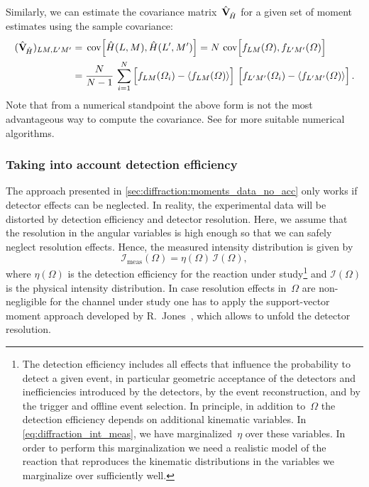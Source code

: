 Similarly, we can estimate the covariance
matrix~$\hat{\mathbf{V}}_{\!\hat{H}}$ for a given set of moment
estimates using the sample covariance:
\begin{align}
  (\hat{\covMatSym}_{\!\hat{H}})_{L M, L' M'}
  ={}& \cov[2]{\hat{H}(L, M), \hat{H}(L', M')}
  = N\, \cov[2]{f_{L M}(\Omega), f_{L' M'}(\Omega)} \notag
  \\
  \label{eq:diffraction_sample_cov}
  ={}& \frac{N}{N - 1}\, \sum_{i = 1}^N \sBrk[2]{f_{L M}(\Omega_i) - \mean{f_{L M}(\Omega)}}\, \sBrk[2]{f_{L' M'}(\Omega_i) - \mean{f_{L' M'}(\Omega)}}.
\end{align}
Note that from a numerical standpoint the above form is not the most
advantageous way to compute the covariance.  See
 for more suitable numerical
algorithms.


\subsubsection{Taking into account detection efficiency}%
\label{sec:diffraction:acceptance_corr}

The approach presented in \cref{sec:diffraction:moments_data_no_acc}
only works if detector effects can be neglected.  In reality, the
experimental data will be distorted by detection efficiency and
detector resolution.  Here, we assume that the resolution in the
angular variables is high enough so that we can safely neglect
resolution effects.  Hence, the measured intensity distribution is
given by
\begin{equation}
  \label{eq:diffraction_int_meas}
  \mathcal{I}_\text{meas}(\Omega)
  = \eta(\Omega)\, \mathcal{I}(\Omega),
\end{equation}
where $\eta(\Omega)$ is the detection efficiency for the reaction
under study\footnote{The detection efficiency includes all effects
that influence the probability to detect a given event, in particular
geometric acceptance of the detectors and inefficiencies introduced by
the detectors, by the event reconstruction, and by the trigger and
offline event selection.  In principle, in addition to~$\Omega$ the
detection efficiency depends on additional kinematic variables.  In
\cref{eq:diffraction_int_meas}, we have marginalized~$\eta$ over these
variables.  In order to perform this marginalization we need a
realistic model of the reaction that reproduces the kinematic
distributions in the variables we marginalize over sufficiently well.}
and $\mathcal{I}(\Omega)$ is the physical intensity distribution.  In case
resolution effects in~$\Omega$ are non-negligible for the channel
under study one has to apply the support-vector moment approach
developed by R.~Jones~\cite{Jones:2023}, which allows to unfold the
detector resolution.

